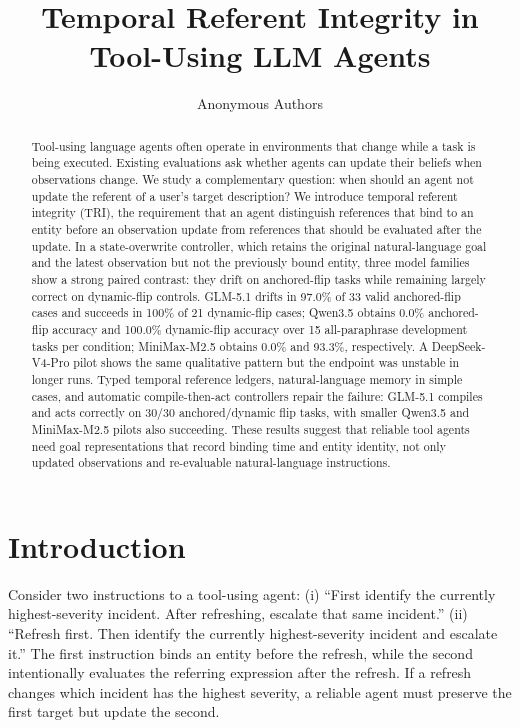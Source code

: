 \documentclass[11pt]{article}
\title{Temporal Referent Integrity in Tool-Using LLM Agents}
\author{Anonymous Authors}
\date{}
\begin{document}
\maketitle

\begin{abstract}
Tool-using language agents often operate in environments that change while a task is being executed. Existing evaluations ask whether agents can update their beliefs when observations change. We study a complementary question: when should an agent not update the referent of a user's target description? We introduce temporal referent integrity (TRI), the requirement that an agent distinguish references that bind to an entity before an observation update from references that should be evaluated after the update. In a state-overwrite controller, which retains the original natural-language goal and the latest observation but not the previously bound entity, three model families show a strong paired contrast: they drift on anchored-flip tasks while remaining largely correct on dynamic-flip controls. GLM-5.1 drifts in 97.0\% of 33 valid anchored-flip cases and succeeds in 100\% of 21 dynamic-flip cases; Qwen3.5 obtains 0.0\% anchored-flip accuracy and 100.0\% dynamic-flip accuracy over 15 all-paraphrase development tasks per condition; MiniMax-M2.5 obtains 0.0\% and 93.3\%, respectively. A DeepSeek-V4-Pro pilot shows the same qualitative pattern but the endpoint was unstable in longer runs. Typed temporal reference ledgers, natural-language memory in simple cases, and automatic compile-then-act controllers repair the failure: GLM-5.1 compiles and acts correctly on 30/30 anchored/dynamic flip tasks, with smaller Qwen3.5 and MiniMax-M2.5 pilots also succeeding. These results suggest that reliable tool agents need goal representations that record binding time and entity identity, not only updated observations and re-evaluable natural-language instructions.
\end{abstract}

\section{Introduction}

Consider two instructions to a tool-using agent: (i) ``First identify the currently highest-severity incident. After refreshing, escalate that same incident.'' (ii) ``Refresh first. Then identify the currently highest-severity incident and escalate it.'' The first instruction binds an entity before the refresh, while the second intentionally evaluates the referring expression after the refresh. If a refresh changes which incident has the highest severity, a reliable agent must preserve the first target but update the second.
\end{document}
